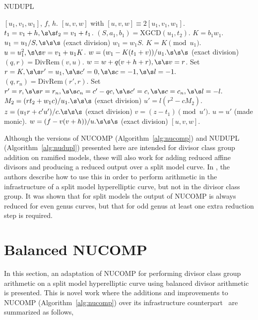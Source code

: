   \begin{algorithm}[htbp]
    \caption{NUDUPL}
    \label{alg:nudupl}
    \begin{algorithmic}[1]
      \Require $[u_1,v_1,w_1]$, $f$, $h.$  
      \Ensure $[u,v,w]$ with $[u,v,w] \equiv 2[u_1,v_1,w_1] $.
      \vspace{5pt}
      \State $t_1 = v_1 + h, \s\s t_2 = v_1 + t_1$.
      \State $(S,a_1,b_1) = \mathrm{XGCD}(u_1,t_2)$.
      \State $K = b_1w_1$.
          \State $u_1 = u_1/S, \s\s\s$ (exact division)
          \State $w_1 = w_1S$.
      \EndIf
      \State $K = K \pmod{u_1}$.
        \State $u = u_1^2, \s\s v = v_1 + u_1K$.
        \State $w = (w_1 - K(t_1 + v))/u_1. \s\s\s$ (exact division)
            \State $(q,r) = \mathrm{DivRem}(v,u)$.
            \State $w = w + q(v + h + r), \s\s v = r$.
        \EndIf
      \Else
        \State Set $r = K, \s\s r' = u_1, \s\s c' = 0, \s\s c = -1, \s\s l = -1.$
            \State $(q,r_n) = \mathrm{DivRem}(r',r)$.
            \State Set $r' = r, \s\s r = r_n, \s\s c_n = c' - qc, \s\s c' = c, \s\s c = c_n, \s\s l = -l.$
        \EndWhile
        \State $M_2 = (rt_2 + w_1c)/u_1. \s\s\s$ (exact division)
        \State $u' = l(r^2 - cM_2)$.
        \State $z = (u_1r + c'u')/c. \s\s\s$ (exact division)
        \State $v = (z - t_1) \pmod{u'}$.
        \State $u = u'$ (made monic).
        \State $w = (f - v(v + h))/u. \s\s\s$ (exact division)
      \EndIf
      \State \Return $[u,v,w]$.
      
    \end{algorithmic}
    \end{algorithm}

Although the versions of NUCOMP (Algorithm~\ref{alg:nucomp}) and NUDUPL
(Algorithm~\ref{alg:nudupl}) presented here are intended for divisor class group
addition on ramified models, these will also work for adding reduced affine
divisors and producing a reduced output over a split model curve. In
\cite{jacobson_fast_2007}, the authors describe how to use this in order to
perform arithmetic in the infrastructure of a split model hyperelliptic curve,
but not in the divisor class group. It was shown that for split models the
output of NUCOMP is always reduced for even genus curves, but that for odd genus
at least one extra reduction step is required.

\section{Balanced NUCOMP}\label{sec:balNUCOMP} In this section, an adaptation of
NUCOMP for performing divisor class group arithmetic on a split model
hyperelliptic curve using balanced divisor arithmetic is presented. This is
novel work where the additions and improvements to NUCOMP
(Algorithm~\ref{alg:nucomp}) over its infrastructure
counterpart~\cite{jacobson_fast_2007} are summarized as follows,

